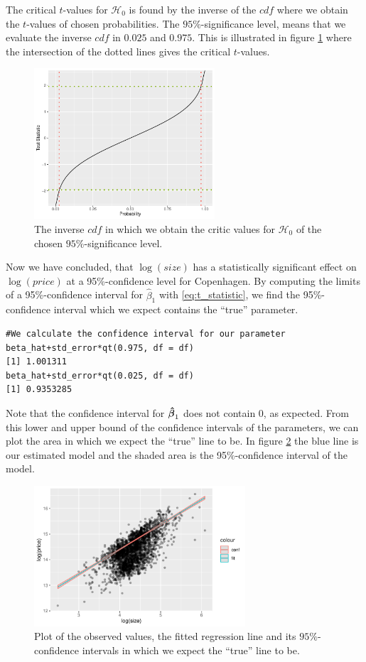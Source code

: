 The critical $t$-values for $\mathcal{H}_0$ is found by the inverse of the $cdf$ where we obtain the $t$-values of chosen probabilities. 
The $95\%$-significance level, means that we evaluate the inverse $cdf$ in $0.025$ and $0.975$. 
This is illustrated in figure \ref{fig:CDF_inverse} where the intersection of the dotted lines gives the critical $t$-values.
\begin{figure}[H]
    \centering
    \includegraphics[width = 0.6\textwidth]{figures/Nanna/Inverse_CDF.pdf}
    \caption{The inverse $cdf$ in which we obtain the critic values for $\mathcal{H}_0$ of the chosen $95\%$-significance level.}
    \label{fig:CDF_inverse}
\end{figure}
Now we have concluded, that $\log(size)$ has a statistically significant effect on $\log(price)$ at a 95\%-confidence level for Copenhagen. 
By computing the limits of a 95\%-confidence interval for $\hat{\beta}_1$ with \eqref{eq:t_statistic}, we find the 95\%-confidence interval which we expect contains the ``true'' parameter.
\begin{lstlisting}
#We calculate the confidence interval for our parameter
beta_hat+std_error*qt(0.975, df = df)
[1] 1.001311
beta_hat+std_error*qt(0.025, df = df)
[1] 0.9353285
\end{lstlisting}
Note that the confidence interval for $\operatorname{\boldsymbol{\hat{\beta}}}_1$ does not contain 0, as expected.
From this lower and upper bound of the confidence intervals of the parameters, we can plot the area in which we expect the ``true'' line to be. 
In figure \ref{fig:t_distributionplot2} the blue line is our estimated model and the shaded area is the 95\%-confidence interval of the model. 
\begin{figure}[H]
    \centering
    \includegraphics[width = 0.7\textwidth]{figures/Nanna/Confidence_interval.pdf}
    \caption{Plot of the observed values, the fitted regression line and its $95\%$-confidence intervals in which we expect the ``true'' line to be.}
    \label{fig:t_distributionplot2}
\end{figure}

